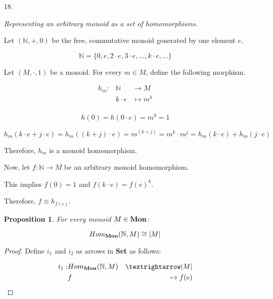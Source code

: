 \documentclass[notitlepage,a4paper]{article}
\newtheorem{proposition}{Proposition}
\begin{document}
\begin{enumerate}
\begin{proof}
\begin{enumerate}
\begin{description}
    \end{description}

  \end{enumerate}

   $h_U^{-1}(⊤) = U$ and $h_{f^{-1}(⊤)} = f$ . Therefore, constructions
   are inverses of each other, and define an isomorphism.

   \end{proof}
  
     
  \item[18.]

    {\em Representing an arbitrary monoid as a set of homomorphisms.}
    
    Let $(\mathbb{N}, +, 0)$ be the free, commutative monoid generated
    by one element $e$.

    $$\mathbb{N} = \{ 0, e, 2·e, 3·e, …, k·e, … \}$$


    Let $(M,·,1)$ be a monoid. For every $m \in M$, define the
    following morphism.

    \begin{eqnarray*}
    h_m : &  \mathbb{N} & →         M   \\
          &        k·e    & \mapsto   m^k \\
    \end{eqnarray*}

    $$h(0) = h(0·e) = m^0 = 1$$ 
    
    $$h_m(k·e + j·e) = h_m((k+j)·e) = m^{(k+j)} = m^k · m^j = h_m(k·e) + h_m(j·e)$$

    Therefore, $h_m$ is a monoid homomorphism.

    Now, let $f : \mathbb{N} → M$ be an arbitrary monoid homomorphism.

    This implies $f(0) = 1$ and $f(k·e) = f(e)^k$.

    Therefore, $f \equiv h_{f(e)}$.

    \begin{proposition}
      For every monoid $M \in \text{\bf Mon}$:

      $$Hom_{\text{\bf Mon}}(\mathbb{N}, M) \cong \vert M \vert$$
    \end{proposition}

    \begin{proof}

      Define $i_1$ and $i_2$ as arrows in {\bf Set} as follows:
      
      \begin{eqnarray*}
        i_1  : &   Hom_{\text{\bf Mon}}(\mathbb{N}, M) &→        \vert M \vert \\      
             & f                              &\mapsto   f(e)          \\
      \end{eqnarray*}


\end{proof}
\end{enumerate}
\end{document}
